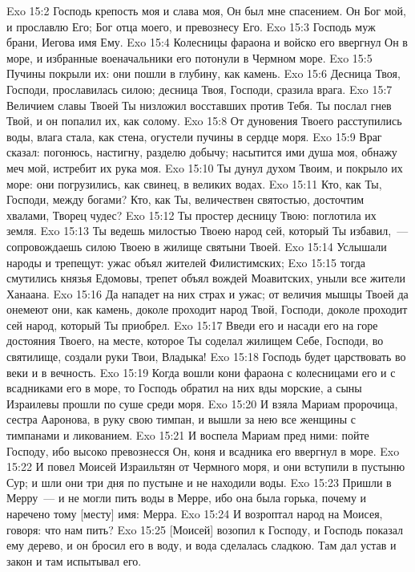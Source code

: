 \vs Exo 15:2 Господь крепость моя и слава моя, Он был мне спасением. Он Бог мой, и прославлю Его; Бог отца моего, и превознесу Его.
\vs Exo 15:3 Господь муж брани, Иегова имя Ему.
\vs Exo 15:4 Колесницы фараона и войско его ввергнул Он в море, и избранные военачальники его потонули в Чермном море.
\vs Exo 15:5 Пучины покрыли их: они пошли в глубину, как камень.
\vs Exo 15:6 Десница Твоя, Господи, прославилась силою; десница Твоя, Господи, сразила врага.
\vs Exo 15:7 Величием славы Твоей Ты низложил восставших против Тебя. Ты послал гнев Твой, и он попалил их, как солому.
\vs Exo 15:8 От дуновения Твоего расступились воды, влага стала, как стена, огустели пучины в сердце моря.
\vs Exo 15:9 Враг сказал: погонюсь, настигну, разделю добычу; насытится ими душа моя, обнажу меч мой, истребит их рука моя.
\vs Exo 15:10 Ты дунул духом Твоим, и покрыло их море: они погрузились, как свинец, в великих водах.
\vs Exo 15:11 Кто, как Ты, Господи, между богами? Кто, как Ты, величествен святостью, досточтим хвалами, Творец чудес?
\vs Exo 15:12 Ты простер десницу Твою: поглотила их земля.
\vs Exo 15:13 Ты ведешь милостью Твоею народ сей, который Ты избавил,~--- сопровождаешь силою Твоею в жилище святыни Твоей.
\vs Exo 15:14 Услышали народы и трепещут: ужас объял жителей Филистимских;
\vs Exo 15:15 тогда смутились князья Едомовы, трепет объял вождей Моавитских, уныли все жители Ханаана.
\vs Exo 15:16 Да нападет на них страх и ужас; от величия мышцы Твоей да онемеют они, как камень, доколе проходит народ Твой, Господи, доколе проходит сей народ, который Ты приобрел.
\vs Exo 15:17 Введи его и насади его на горе достояния Твоего, на месте, которое Ты соделал жилищем Себе, Господи, во святилище,  создали руки Твои, Владыка!
\vs Exo 15:18 Господь будет царствовать во веки и в вечность.
\vs Exo 15:19 Когда вошли кони фараона с колесницами его и с всадниками его в море, то Господь обратил на них вды морские, а сыны Израилевы прошли по суше среди моря.
\rsbpar\vs Exo 15:20 И взяла Мариам пророчица, сестра Ааронова, в руку свою тимпан, и вышли за нею все женщины с тимпанами и ликованием.
\vs Exo 15:21 И воспела Мариам пред ними: пойте Господу, ибо высоко превознесся Он, коня и всадника его ввергнул в море.
\rsbpar\vs Exo 15:22 И повел Моисей Израильтян от Чермного моря, и они вступили в пустыню Сур; и шли они три дня по пустыне и не находили воды.
\vs Exo 15:23 Пришли в Мерру~--- и не могли пить воды в Мерре, ибо она была горька, почему и наречено тому [месту] имя: Мерра.
\vs Exo 15:24 И возроптал народ на Моисея, говоря: что нам пить?
\vs Exo 15:25 [Моисей] возопил к Господу, и Господь показал ему дерево, и он бросил его в воду, и вода сделалась сладкою. Там  дал  устав и закон и там испытывал его.
